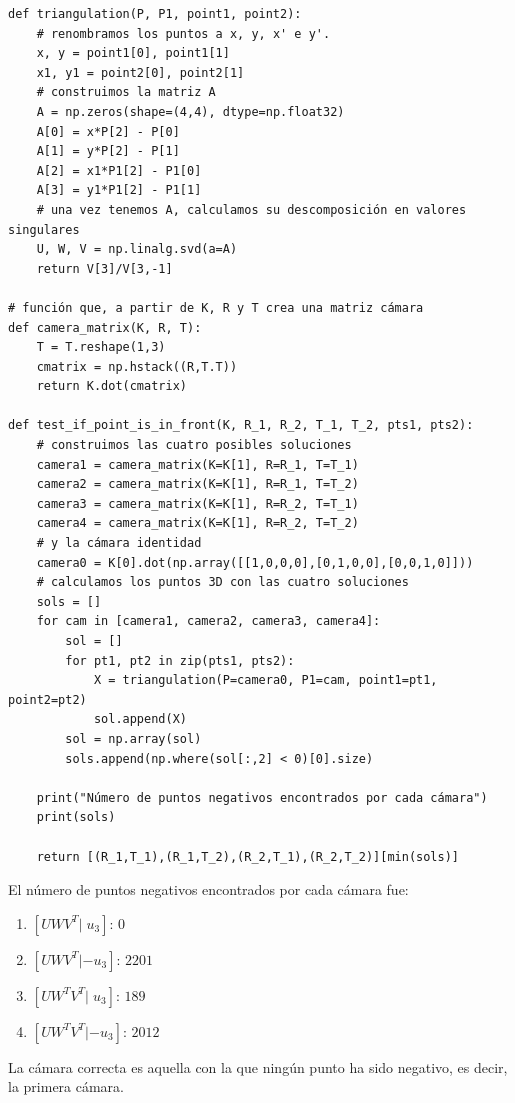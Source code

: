 \documentclass[11pt,a4paper]{article}
\theoremstyle{plain}
\theoremstyle{definition}
\begin{document}
\begin{verbatim}
def triangulation(P, P1, point1, point2):
    # renombramos los puntos a x, y, x' e y'.
    x, y = point1[0], point1[1]
    x1, y1 = point2[0], point2[1]
    # construimos la matriz A
    A = np.zeros(shape=(4,4), dtype=np.float32)
    A[0] = x*P[2] - P[0]
    A[1] = y*P[2] - P[1]
    A[2] = x1*P1[2] - P1[0]
    A[3] = y1*P1[2] - P1[1]
    # una vez tenemos A, calculamos su descomposición en valores singulares
    U, W, V = np.linalg.svd(a=A)
    return V[3]/V[3,-1]

# función que, a partir de K, R y T crea una matriz cámara
def camera_matrix(K, R, T):
    T = T.reshape(1,3)
    cmatrix = np.hstack((R,T.T))
    return K.dot(cmatrix)

def test_if_point_is_in_front(K, R_1, R_2, T_1, T_2, pts1, pts2):
    # construimos las cuatro posibles soluciones
    camera1 = camera_matrix(K=K[1], R=R_1, T=T_1)
    camera2 = camera_matrix(K=K[1], R=R_1, T=T_2)
    camera3 = camera_matrix(K=K[1], R=R_2, T=T_1)
    camera4 = camera_matrix(K=K[1], R=R_2, T=T_2)
    # y la cámara identidad
    camera0 = K[0].dot(np.array([[1,0,0,0],[0,1,0,0],[0,0,1,0]]))
    # calculamos los puntos 3D con las cuatro soluciones
    sols = []
    for cam in [camera1, camera2, camera3, camera4]:
        sol = []
        for pt1, pt2 in zip(pts1, pts2):
            X = triangulation(P=camera0, P1=cam, point1=pt1, point2=pt2)
            sol.append(X)
        sol = np.array(sol)
        sols.append(np.where(sol[:,2] < 0)[0].size)

    print("Número de puntos negativos encontrados por cada cámara")
    print(sols)

    return [(R_1,T_1),(R_1,T_2),(R_2,T_1),(R_2,T_2)][min(sols)]
\end{verbatim}

El número de puntos negativos encontrados por cada cámara fue:

\begin{enumerate}[---]
    \item $[UWV^T | \;u_3]$: $0$
    \item $[UWV^T | -u_3]$: $2201$
    \item $[UW^T V^T |\; u_3]$: $189$
    \item $[UW^T V^T | -u_3]$: $2012$
\end{enumerate}

La cámara correcta es aquella con la que ningún punto ha sido negativo, es decir, la primera cámara.

\end{document}
